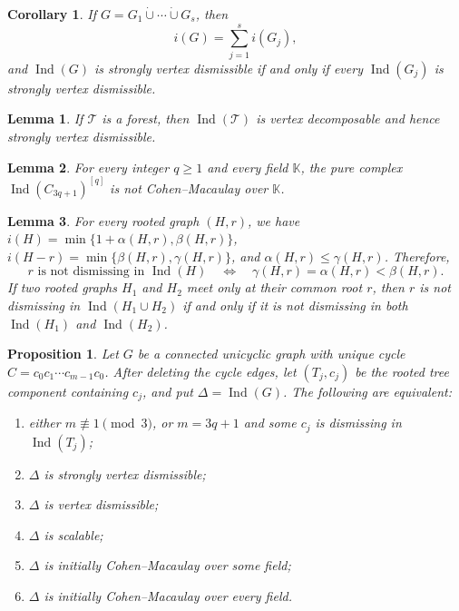 \documentclass[10pt,a4paper]{amsart}
\newtheorem{corollary}{Corollary}
\newtheorem{lemma}{Lemma}
\newtheorem{proposition}{Proposition}
\DeclareMathOperator{\Ind}{Ind}
\newcommand{\K}{\mathbb K}
\begin{document}
	\begin{corollary}\label{cor:7}
		If $G=G_1\mathbin{\dot\cup}\cdots\mathbin{\dot\cup}G_s$, then
		\[
		i(G)=\sum_{j=1}^s i(G_j),
		\]
		and $\Ind(G)$ is strongly vertex dismissible if and only if every $\Ind(G_j)$ is strongly vertex dismissible.
	\end{corollary}

	\begin{lemma}\label{lem:5}
		If $\mathcal T$ is a forest, then $\Ind(\mathcal T)$ is vertex decomposable and hence strongly vertex dismissible.
	\end{lemma}

	\begin{lemma}\label{lem:6}
		For every integer $q\geq1$ and every field $\K$, the pure complex $\Ind(C_{3q+1})^{[q]}$ is not Cohen--Macaulay over $\K$.
	\end{lemma}

	\begin{lemma}\label{lem:7}
		For every rooted graph $(H,r)$, we have $i(H)=\min\{1+\alpha(H,r),\beta(H,r)\}$, $i(H-r)=\min\{\beta(H,r),\gamma(H,r)\}$, and $\alpha(H,r)\leq \gamma(H,r)$.  Therefore,
		\[
		r\text{ is not dismissing in }\Ind(H)
		\quad\Longleftrightarrow\quad
		\gamma(H,r)=\alpha(H,r)<\beta(H,r).
		\]
		If two rooted graphs $H_1$ and $H_2$ meet only at their common root $r$, then $r$ is not dismissing in $\Ind(H_1\cup H_2)$ if and only if it is not dismissing in both $\Ind(H_1)$ and $\Ind(H_2)$.
	\end{lemma}

	\begin{proposition}\label{prop:7}
		Let $G$ be a connected unicyclic graph with unique cycle $C=c_0c_1\cdots c_{m-1}c_0$. After deleting the cycle edges, let $(T_j,c_j)$ be the rooted tree component containing $c_j$, and put $\Delta=\Ind(G)$.  The following are equivalent:
		\begin{enumerate}[label=\textup{(\roman*)}]
			\item either $m\not\equiv1\pmod3$, or $m=3q+1$ and some $c_j$ is dismissing in $\Ind(T_j)$;
			\item $\Delta$ is strongly vertex dismissible;
			\item $\Delta$ is vertex dismissible;
			\item $\Delta$ is scalable;
			\item $\Delta$ is initially Cohen--Macaulay over some field;
			\item $\Delta$ is initially Cohen--Macaulay over every field.
		\end{enumerate}
	\end{proposition}
\end{document}
